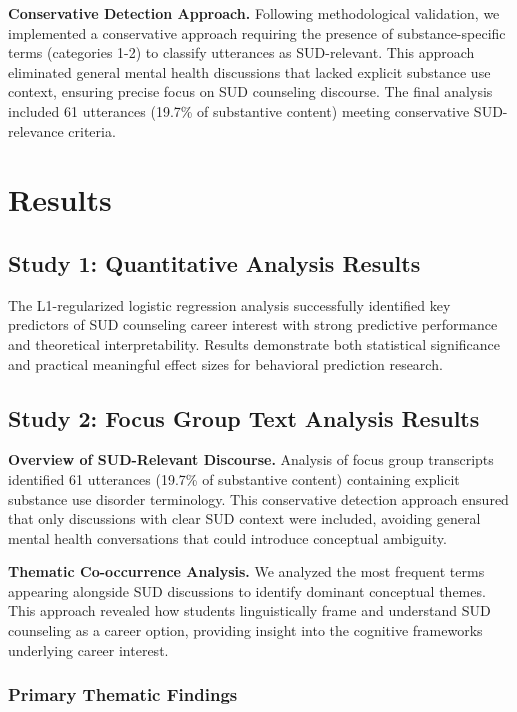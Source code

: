 \documentclass[
  man,
  longtable,
  nolmodern,
  notxfonts,
  notimes,
  colorlinks=true,linkcolor=blue,citecolor=blue,urlcolor=blue]{apa7}
\begin{document}
\textbf{Conservative Detection Approach.} Following methodological
validation, we implemented a conservative approach requiring the
presence of substance-specific terms (categories 1-2) to classify
utterances as SUD-relevant. This approach eliminated general mental
health discussions that lacked explicit substance use context, ensuring
precise focus on SUD counseling discourse. The final analysis included
61 utterances (19.7\% of substantive content) meeting conservative
SUD-relevance criteria.

\section{Results}\label{results}

\subsection{Study 1: Quantitative Analysis
Results}\label{study-1-quantitative-analysis-results}

The L1-regularized logistic regression analysis successfully identified
key predictors of SUD counseling career interest with strong predictive
performance and theoretical interpretability. Results demonstrate both
statistical significance and practical meaningful effect sizes for
behavioral prediction research.

\subsection{Study 2: Focus Group Text Analysis
Results}\label{study-2-focus-group-text-analysis-results}

\textbf{Overview of SUD-Relevant Discourse.} Analysis of focus group
transcripts identified 61 utterances (19.7\% of substantive content)
containing explicit substance use disorder terminology. This
conservative detection approach ensured that only discussions with clear
SUD context were included, avoiding general mental health conversations
that could introduce conceptual ambiguity.

\textbf{Thematic Co-occurrence Analysis.} We analyzed the most frequent
terms appearing alongside SUD discussions to identify dominant
conceptual themes. This approach revealed how students linguistically
frame and understand SUD counseling as a career option, providing
insight into the cognitive frameworks underlying career interest.

\subsubsection{Primary Thematic
Findings}\label{primary-thematic-findings}
\end{document}

